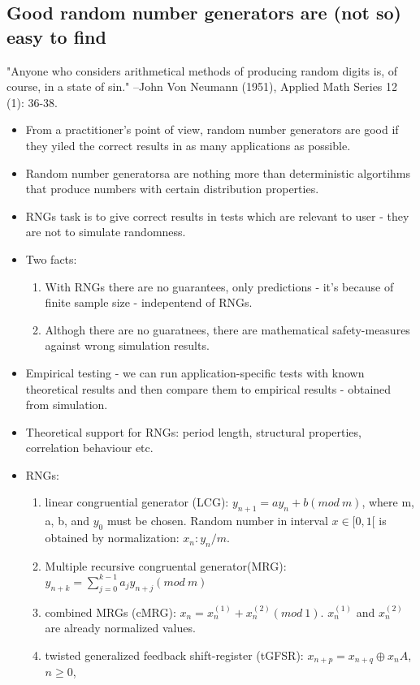 \documentclass[10pt,a4paper]{article}
\begin{document}
\subsection{Good random number generators are (not so) easy to find \cite{hell:98}}
"Anyone who considers arithmetical methods of producing random digits is, of course, in a state of sin."
--John Von Neumann (1951), Applied Math Series 12 (1): 36-38.
\begin{itemize}
\item From a practitioner's point of view, random number generators are good if they yiled the correct results in as many applications as possible.
\item Random number generatorsa are nothing more than deterministic algortihms that produce numbers with certain distribution properties.
\item RNGs task is to give correct results in tests which are relevant to user - they are not to simulate randomness. 
\item Two facts:
\begin{enumerate}
 \item With RNGs there are no guarantees, only predictions - it's because of finite sample size - indepentend of RNGs.
 \item Althogh there are no guaratnees, there are mathematical safety-measures against wrong simulation results. 
\end{enumerate}
\item Empirical testing - we can run application-specific tests with known theoretical results and then compare them to empirical results - obtained from simulation.
\item Theoretical support for RNGs: period length, structural properties, correlation behaviour etc. 
\item RNGs:
\begin{enumerate}
 \item linear congruential generator (LCG): $y_{n+1} = ay_{n}+b(mod ~ m)$, where m, a, b, and $y_0$ must be chosen.
 Random number in interval $x \in [0,1[$ is obtained by normalization: $x_n:y_n/m$.
 \item Multiple recursive congruental generator(MRG): $y_{n+k} = \sum_{j=0}^{k-1}a_j y_{n+j} (mod ~ m)$
 \item combined MRGs (cMRG): $x_n = x_n^{(1)} + x_{n}^{(2)} (mod ~ 1)$. $x_n^{(1)}$ and $x_{n}^{(2)}$ are already normalized values.
 \item twisted generalized feedback shift-register (tGFSR): $x_{n+p} = x_{n+q}\oplus x_{n}A$, $n \ge 0$,

\end{enumerate}
\end{itemize}
\end{document}
